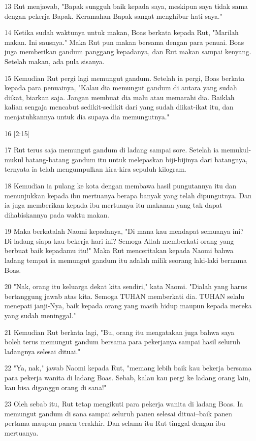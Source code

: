 \par 13 Rut menjawab, "Bapak sungguh baik kepada saya, meskipun saya tidak sama dengan pekerja Bapak. Keramahan Bapak sangat menghibur hati saya."
\par 14 Ketika sudah waktunya untuk makan, Boas berkata kepada Rut, "Marilah makan. Ini sausnya." Maka Rut pun makan bersama dengan para penuai. Boas juga memberikan gandum panggang kepadanya, dan Rut makan sampai kenyang. Setelah makan, ada pula sisanya.
\par 15 Kemudian Rut pergi lagi memungut gandum. Setelah ia pergi, Boas berkata kepada para penuainya, "Kalau dia memungut gandum di antara yang sudah diikat, biarkan saja. Jangan membuat dia malu atau memarahi dia. Baiklah kalian sengaja mencabut sedikit-sedikit dari yang sudah diikat-ikat itu, dan menjatuhkannya untuk dia supaya dia memungutnya."
\par 16 [2:15]
\par 17 Rut terus saja memungut gandum di ladang sampai sore. Setelah ia memukul-mukul batang-batang gandum itu untuk melepaskan biji-bijinya dari batangnya, ternyata ia telah mengumpulkan kira-kira sepuluh kilogram.
\par 18 Kemudian ia pulang ke kota dengan membawa hasil pungutannya itu dan menunjukkan kepada ibu mertuanya berapa banyak yang telah dipungutnya. Dan ia juga memberikan kepada ibu mertuanya itu makanan yang tak dapat dihabiskannya pada waktu makan.
\par 19 Maka berkatalah Naomi kepadanya, "Di mana kau mendapat semuanya ini? Di ladang siapa kau bekerja hari ini? Semoga Allah memberkati orang yang berbuat baik kepadamu itu!" Maka Rut menceritakan kepada Naomi bahwa ladang tempat ia memungut gandum itu adalah milik seorang laki-laki bernama Boas.
\par 20 "Nak, orang itu keluarga dekat kita sendiri," kata Naomi. "Dialah yang harus bertanggung jawab atas kita. Semoga TUHAN memberkati dia. TUHAN selalu menepati janji-Nya, baik kepada orang yang masih hidup maupun kepada mereka yang sudah meninggal."
\par 21 Kemudian Rut berkata lagi, "Bu, orang itu mengatakan juga bahwa saya boleh terus memungut gandum bersama para pekerjanya sampai hasil seluruh ladangnya selesai dituai."
\par 22 "Ya, nak," jawab Naomi kepada Rut, "memang lebih baik kau bekerja bersama para pekerja wanita di ladang Boas. Sebab, kalau kau pergi ke ladang orang lain, kau bisa diganggu orang di sana!"
\par 23 Oleh sebab itu, Rut tetap mengikuti para pekerja wanita di ladang Boas. Ia memungut gandum di sana sampai seluruh panen selesai dituai--baik panen pertama maupun panen terakhir. Dan selama itu Rut tinggal dengan ibu mertuanya.

